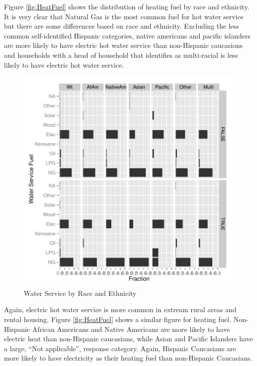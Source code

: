 \documentclass{article}
\begin{document}
Figure \ref{fig:HeatFuel} shows the distribution of heating fuel by race and ethnicity.  It is very clear that Natural Gas is the most common fuel for hot water service but there are some differences based on race and ethnicity.  Excluding the less common self-identified Hispanic categories, native americans and pacific islanders are more likely to have electric hot water service than non-Hispanic caucasions and households with a head of household that identifies as multi-racial is less likely to have electric hot water service.  

\begin{figure}[htbp]
\begin{center}
\caption{Water Service by Race and Ethnicity}
\label{fig:WaterService}
\includegraphics{DraftEdwardsWoods-007}
\end{center}
\end{figure}

Again, electric hot water service is more common in extream rural areas and rental housing.  Figure \ref{fig:HeatFuel} shows a similar figure for heating fuel.  Non-Hispanic African Americans and Native Americans are more likely to have electric heat than non-Hispanic caucasians, while Asian and Pacific Islanders have a large, ``Not applicable'', response category.   Again, Hispanic Caucasians are more likely to have electricity as their heating fuel than non-Hispanic Caucasians.
\end{document}
